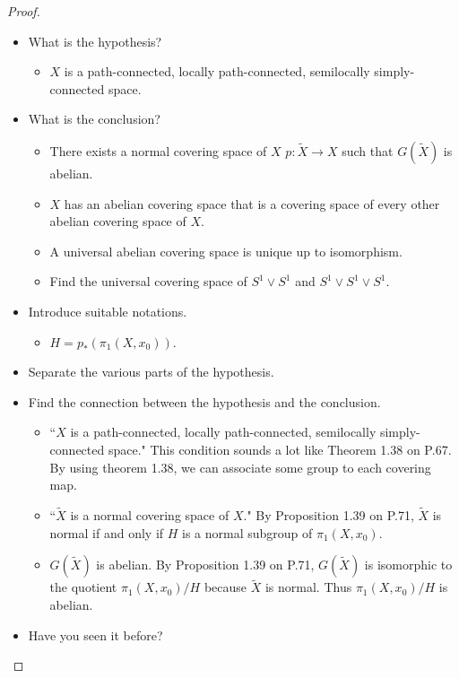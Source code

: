 \documentclass[12pt, psamsfonts]{amsart}
\theoremstyle{definition}
\theoremstyle{remark}
\numberwithin{equation}{section}
\begin{document}
\begin{proof}
\begin{itemize}
  \item
    What is the hypothesis?
    \begin{itemize}
      \item $X$ is a path-connected, locally path-connected, semilocally simply-connected space.
    \end{itemize}
  \item What is the conclusion?
    \begin{itemize}
      \item There exists a normal covering space of $X$ $p: \tilde{X} \rightarrow X$ such that $G(\tilde{X})$ is abelian.
      \item $X$ has an abelian covering space that is a covering space of every other abelian covering space of $X$.
      \item A universal abelian covering space is unique up to isomorphism.
      \item Find the universal covering space of $S^1 \vee S^1$ and $S^1 \vee S^1 \vee S^1$.
    \end{itemize}
  \item
    Introduce suitable notations.
    \begin{itemize}
      \item $H = p_*(\pi_1(X, x_0))$.
    \end{itemize}
  \item Separate the various parts of the hypothesis.
  \item Find the connection between the hypothesis and the conclusion.
    \begin{itemize}
      \item
        ``$X$ is a path-connected, locally path-connected, semilocally simply-connected space."
        This condition sounds a lot like Theorem 1.38 on P.67.
        By using theorem 1.38, we can associate some group to each covering map.
      \item
        ``$\tilde{X}$ is a normal covering space of $X$."
        By Proposition 1.39 on P.71, $\tilde{X}$ is normal if and only if $H$ is a normal subgroup of $\pi_1(X, x_0)$.
      \item
        $G(\tilde{X})$ is abelian.
        By Proposition 1.39 on P.71, $G(\tilde{X})$ is isomorphic to the quotient $\pi_1(X, x_0) / H$ because $\tilde{X}$ is normal.
        Thus $\pi_1(X, x_0) / H$ is abelian.
    \end{itemize}
  \item Have you seen it before?

\end{itemize}
\end{proof}
\end{document}
